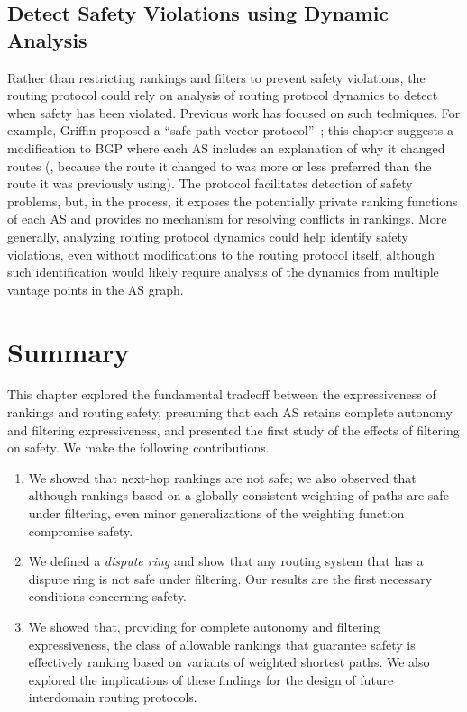 \subsection{Detect Safety Violations using Dynamic Analysis}

Rather than restricting rankings and filters to prevent safety
violations, the routing protocol could rely on analysis of routing
protocol dynamics to detect when safety has been violated.  Previous
work has focused on such techniques.  For example, Griffin \ea proposed
a ``safe path vector protocol''~\cite{Griffin2000}; this chapter suggests
a modification to BGP where each AS includes an explanation of why it
changed routes (\eg, because the route it changed to was more or less
preferred than the route it was previously using).  The protocol
facilitates detection of safety problems, but, in the process, it
exposes the potentially private ranking functions of each AS and
provides no mechanism for resolving conflicts in rankings.  More
generally, analyzing routing protocol dynamics could help identify
safety violations, even without modifications to the routing protocol
itself, although such identification would likely require analysis of
the dynamics from multiple vantage points in the AS graph.


\section{Summary}
\label{sec:policy:conclusion}

This chapter explored the fundamental tradeoff between the
expressiveness of rankings and routing safety, presuming that each AS
retains complete autonomy and filtering expressiveness, and presented
the first study of the effects of filtering on safety.  We make the
following contributions.

\begin{enumerate}
\itemsep=-1pt
\item We showed that next-hop rankings are not safe; we also observed
that although rankings based on a globally consistent weighting of paths
are safe under filtering, even minor generalizations of the weighting
function compromise safety.
\item We defined a {\em dispute ring} and show that any routing system
that has a dispute ring is not safe under filtering.  Our results are
the first necessary conditions concerning safety.
\item We showed that, providing for complete autonomy and filtering
expressiveness, the class of allowable rankings that guarantee safety is
effectively ranking based on variants of weighted shortest paths.  We
also explored the implications of these findings for the design of
future interdomain routing protocols.
\end{enumerate}

